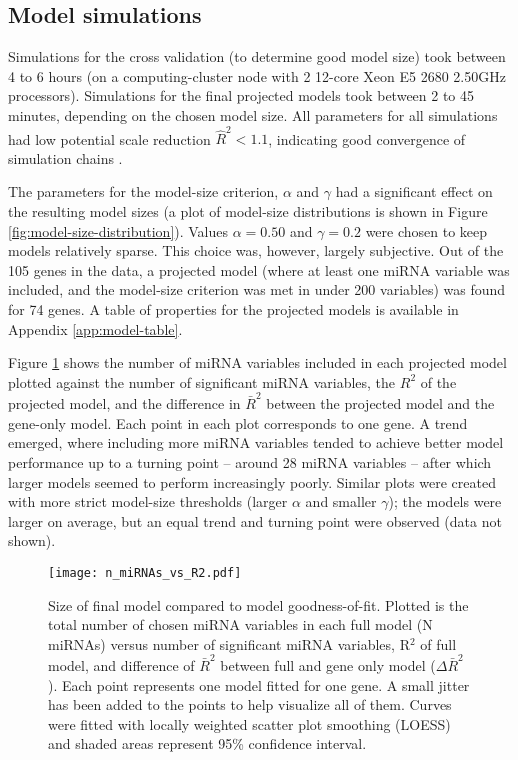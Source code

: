 \subsection*{Model simulations}

Simulations for the cross validation (to determine good model size) took
between 4 to 6 hours (on a computing-cluster node with 2 12-core Xeon E5 2680
2.50GHz processors). Simulations for the final projected models took between 2
to 45 minutes, depending on the chosen model size. All parameters for all
simulations had low potential scale reduction $\hat{R}^2 < 1.1$, indicating
good convergence of simulation chains \citep{Gelman2013}.

The parameters for the model-size criterion, $\alpha$ and $\gamma$ had a
significant effect on the resulting model sizes (a plot of model-size
distributions is shown in Figure \ref{fig:model-size-distribution}).
Values $\alpha = 0.50$ and $\gamma = 0.2$ were chosen to keep models
relatively sparse. This choice was, however, largely subjective. Out of the
105 genes in the data, a projected model (where at least one miRNA variable
was included, and the model-size criterion was met in under 200 variables) was
found for 74 genes. A table of properties for the projected models is
available in Appendix \ref{app:model-table}.

Figure \ref{n-miRNAs-vs-R2} shows the number of miRNA variables included in
each projected model plotted against the number of significant miRNA
variables, the $R^2$ of the projected model, and the difference in $\bar{R}^2$
between the projected model and the gene-only model. Each point in each plot
corresponds to one gene. A trend emerged, where including more
miRNA variables tended to achieve better model performance up to a turning point --
around 28 miRNA variables -- after which larger models seemed to perform
increasingly poorly. Similar plots were created with more strict model-size
thresholds (larger $\alpha$ and smaller $\gamma$); the models were larger on
average, but an equal trend and turning point were observed (data not shown).

\begin{figure}[!h]
  \centering
  \texttt{[image: n\_miRNAs\_vs\_R2.pdf]}
  \caption{Size of final model compared to model goodness-of-fit. Plotted is
  the total number of chosen miRNA variables in each full model (N miRNAs)
  versus number of significant miRNA variables, R$^2$ of full model, and
  difference of $\bar{R}^2$ between full and gene only model
  ($\Delta\bar{R}^2$). Each point represents one model fitted for one gene. A
  small jitter has been added to the points to help visualize all of them.
  Curves were fitted with locally weighted scatter plot smoothing (LOESS) and
  shaded areas represent 95\% confidence interval.}
  \label{n-miRNAs-vs-R2}
\end{figure}


